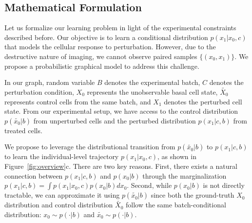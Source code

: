 

\subsection{Mathematical Formulation}

\begin{center}
\vspace{-10pt}
\end{center}

Let us formalize our learning problem in light of the experimental constraints described before. Our objective is to learn a conditional distribution $p(x_1|x_0,c)$ that models the cellular response to perturbation. However, due to the destructive nature of imaging, we cannot observe paired samples $\{(x_0,x_1)\}$. We propose a probabilistic graphical model to address this challenge.

In our graph, random variable $B$ denotes the experimental batch, $C$ denotes the perturbation condition, $X_0$ represents the unobservable basal cell state, $\tilde{X_0}$ represents control cells from the same batch, and $X_1$ denotes the perturbed cell state. From our experimental setup, we have access to the control distribution $p(\tilde{x_0}|b)$ from unperturbed cells and the perturbed distribution $p(x_1|c,b)$ from treated cells.

We propose to leverage the distributional transition from $p(\tilde{x_0}|b)$ to $p(x_1|c,b)$ to learn the individual-level trajectory $p(x_1|x_0,c)$, as shown in Figure~\ref{fig:overview}c. There are two key reasons. First, there exists a natural connection between $p(x_1|c,b)$ and $p(x_0|b)$ through the marginalization $p(x_1|c,b)= \int p(x_1|x_0,c) p(x_0|b) dx_0$. Second, while $p(x_0|b)$ is not directly tractable, we can approximate it using $p(\tilde{x_0}|b)$ since both the ground-truth $X_0$ distribution and control distribution $\tilde{X_0}$ follow the same batch-conditional distribution: $x_0 \sim p(\cdot|b)$ and $\tilde{x_0} \sim p(\cdot|b)$. 

